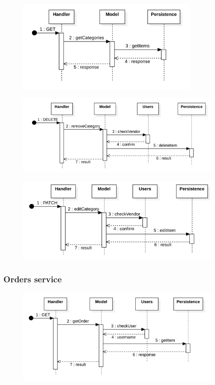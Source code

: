 \begin{figure}[H]
    \includegraphics[width=0.8\textwidth]{res/images/sequence-diagrams/categories/getCategories.png}
\end{figure}

\begin{figure}[H]
    \includegraphics[width=0.9\textwidth]{res/images/sequence-diagrams/categories/removeCategory.png}
\end{figure}

\begin{figure}[H]
    \includegraphics[width=0.9\textwidth]{res/images/sequence-diagrams/categories/updateCategory.png}
\end{figure}

\subsubsection{Orders service}
\begin{figure}[H]
    \includegraphics[width=0.9\textwidth]{res/images/sequence-diagrams/orders/getOrderByID.png}
\end{figure}

